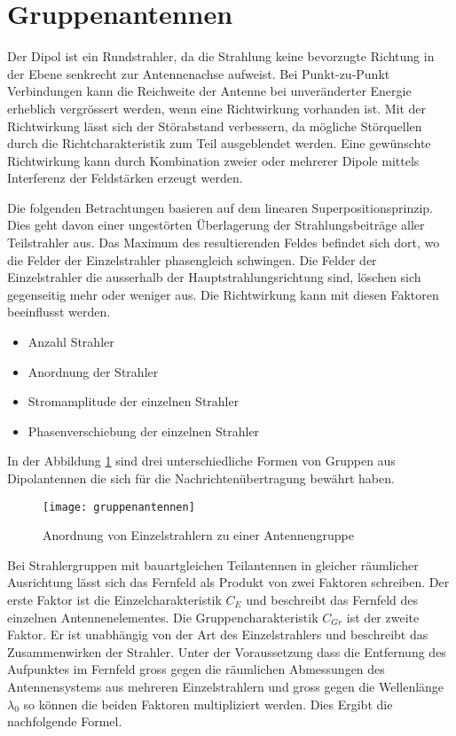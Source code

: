 \section{Gruppenantennen}\label{sec:gruppenantennen}
Der Dipol ist ein Rundstrahler, da die Strahlung keine bevorzugte Richtung in der Ebene senkrecht zur Antennenachse aufweist. Bei Punkt-zu-Punkt Verbindungen kann die Reichweite der Antenne bei unveränderter Energie erheblich vergrössert werden, wenn eine Richtwirkung vorhanden ist. Mit der Richtwirkung lässt sich der Störabstand verbessern, da mögliche Störquellen durch die Richtcharakteristik zum Teil ausgeblendet werden. Eine gewünschte Richtwirkung kann durch Kombination zweier oder mehrerer Dipole mittels Interferenz der Feldstärken erzeugt werden. 

Die folgenden Betrachtungen basieren auf dem linearen Superpositionsprinzip. Dies geht davon einer ungestörten Überlagerung der Strahlungsbeiträge aller Teilstrahler aus. Das Maximum des resultierenden Feldes befindet sich dort, wo die Felder der Einzelstrahler phasengleich schwingen. Die Felder der Einzelstrahler die ausserhalb der Hauptstrahlungsrichtung sind, löschen sich gegenseitig mehr oder weniger aus. Die Richtwirkung kann mit diesen Faktoren beeinflusst werden.

\begin{itemize}
	\item Anzahl Strahler
	\item Anordnung der Strahler
	\item Stromamplitude der einzelnen Strahler
	\item Phasenverschiebung der einzelnen Strahler
\end{itemize}

In der Abbildung \ref{fig:gruppenantennen} sind drei unterschiedliche Formen von Gruppen aus Dipolantennen die sich für die Nachrichtenübertragung bewährt haben. 

\begin{figure}[H]
	\centering
	\texttt{[image: gruppenantennen]}
	\caption{Anordnung von Einzelstrahlern zu einer Antennengruppe}\label{fig:gruppenantennen}
\end{figure}

Bei Strahlergruppen mit bauartgleichen Teilantennen in gleicher räumlicher Ausrichtung lässt sich das Fernfeld als Produkt von zwei Faktoren schreiben. Der erste Faktor ist die Einzelcharakteristik $ C_{E} $ und beschreibt das Fernfeld des einzelnen Antennenelementes. Die Gruppencharakteristik $ C_{Gr} $ ist der zweite Faktor. Er ist unabhängig von der Art des Einzelstrahlers und beschreibt das Zusammenwirken der Strahler. Unter der Voraussetzung dass die Entfernung des Aufpunktes im Fernfeld gross gegen die räumlichen Abmessungen des Antennensystems aus mehreren Einzelstrahlern und gross gegen die Wellenlänge $ \lambda_{0} $ so können die beiden Faktoren multipliziert werden. Dies Ergibt die nachfolgende Formel.

